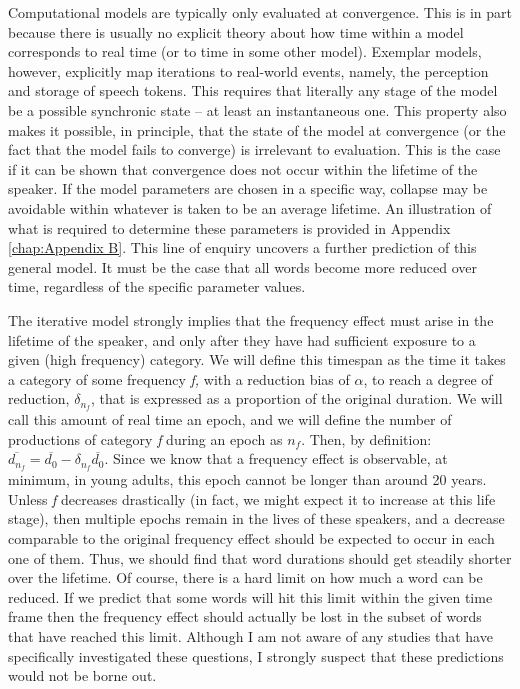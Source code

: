 Computational models are typically only evaluated at convergence.
This is in part because there is usually no explicit theory about
how time within a model corresponds to real time (or to time in some
other model). Exemplar models, however, explicitly map iterations
to real-world events, namely, the perception and storage of speech
tokens. This requires that literally any stage of the model be a possible
synchronic state – at least an instantaneous one. This property also
makes it possible, in principle, that the state of the model at convergence
(or the fact that the model fails to converge) is irrelevant to evaluation.
This is the case if it can be shown that convergence does not occur
within the lifetime of the speaker. If the model parameters are chosen
in a specific way, collapse may be avoidable within whatever is taken
to be an average lifetime. An illustration of what is required to
determine these parameters is provided in Appendix \ref{chap:Appendix B}.
This line of enquiry uncovers a further prediction of this general
model. It must be the case that all words become more reduced over
time, regardless of the specific parameter values. 

The iterative model strongly implies that the frequency effect must
arise in the lifetime of the speaker, and only after they have had
sufficient exposure to a given (high frequency) category. We will
define this timespan as the time it takes a category of some frequency
\emph{f,} with a reduction bias of $\alpha$, to reach a degree of
reduction, $\delta_{n_{f}}$, that is expressed as a proportion of
the original duration. We will call this amount of real time an epoch,
and we will define the number of productions of category \emph{f}
during an epoch as $n_{f}$. Then, by definition: $\overline{d_{n_{f}}}=\overline{d_{0}}-\delta_{n_{f}}\overline{d_{0}}$.
Since we know that a frequency effect is observable, at minimum, in
young adults, this epoch cannot be longer than around 20 years. Unless
\emph{f }decreases drastically (in fact, we might expect it to increase
at this life stage), then multiple epochs remain in the lives of these
speakers, and a decrease comparable to the original frequency effect
should be expected to occur in each one of them. Thus, we should find
that word durations should get steadily shorter over the lifetime.
Of course, there is a hard limit on how much a word can be reduced.
If we predict that some words will hit this limit within the given
time frame then the frequency effect should actually be lost in the
subset of words that have reached this limit. Although I am not aware
of any studies that have specifically investigated these questions,
I strongly suspect that these predictions would not be borne out.

